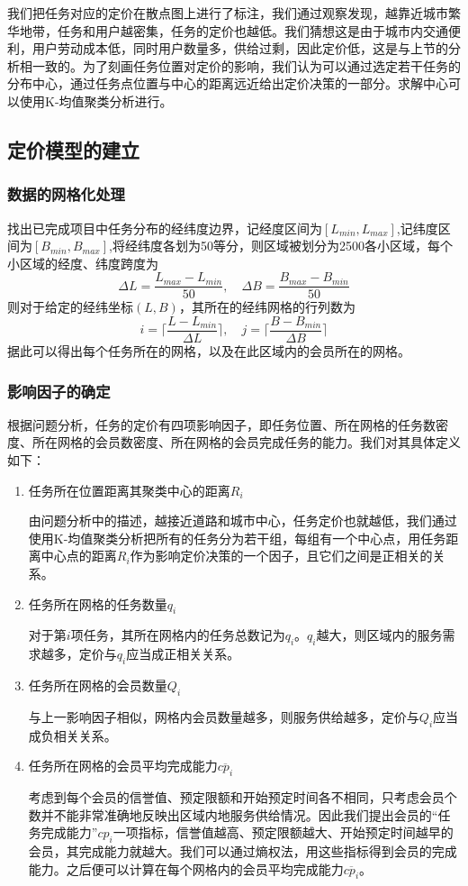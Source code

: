 \documentclass[withoutpreface,bwprint]{cumcmthesis} %
\begin{document}
我们把任务对应的定价在散点图上进行了标注，我们通过观察发现，越靠近城市繁华地带，任务和用户越密集，任务的定价也越低。我们猜想这是由于城市内交通便利，用户劳动成本低，同时用户数量多，供给过剩，因此定价低，这是与上节的分析相一致的。为了刻画任务位置对定价的影响，我们认为可以通过选定若干任务的分布中心，通过任务点位置与中心的距离远近给出定价决策的一部分。求解中心可以使用K-均值聚类分析进行。

\subsection{定价模型的建立}

\subsubsection{数据的网格化处理}
找出已完成项目中任务分布的经纬度边界，记经度区间为$[L_{min},L_{max}]$,记纬度区间为$[B_{min},B_{max}]$,将经纬度各划为50等分，则区域被划分为2500各小区域，每个小区域的经度、纬度跨度为$$\Delta L=\frac{L_{max}-L_{min}}{50},\quad \Delta B=\frac{B_{max}-B_{min}}{50}$$则对于给定的经纬坐标$(L,B)$，其所在的经纬网格的行列数为$$i=\lceil \frac{L-L_{min}}{\Delta L}\rceil,\quad j=\lceil \frac{B-B_{min}}{\Delta B}\rceil$$据此可以得出每个任务所在的网格，以及在此区域内的会员所在的网格。

\subsubsection{影响因子的确定}
根据问题分析，任务的定价有四项影响因子，即任务位置、所在网格的任务数密度、所在网格的会员数密度、所在网格的会员完成任务的能力。我们对其具体定义如下：
\begin{enumerate}
    \item 任务所在位置距离其聚类中心的距离$R_i$

          由问题分析中的描述，越接近道路和城市中心，任务定价也就越低，我们通过使用K-均值聚类分析把所有的任务分为若干组，每组有一个中心点，用任务距离中心点的距离$R_i$作为影响定价决策的一个因子，且它们之间是正相关的关系。
    \item 任务所在网格的任务数量$q_i$

          对于第$i$项任务，其所在网格内的任务总数记为$q_i$。$q_i$越大，则区域内的服务需求越多，定价与$q_i$应当成正相关关系。
    \item 任务所在网格的会员数量$Q_i$

          与上一影响因子相似，网格内会员数量越多，则服务供给越多，定价与$Q_i$应当成负相关关系。
    \item 任务所在网格的会员平均完成能力$\overline{cp_i}$

          考虑到每个会员的信誉值、预定限额和开始预定时间各不相同，只考虑会员个数并不能非常准确地反映出区域内地服务供给情况。因此我们提出会员的“任务完成能力”$cp_i$一项指标，信誉值越高、预定限额越大、开始预定时间越早的会员，其完成能力就越大。我们可以通过熵权法，用这些指标得到会员的完成能力。之后便可以计算在每个网格内的会员平均完成能力$\overline{cp_i}$。
\end{enumerate}
\end{document}
